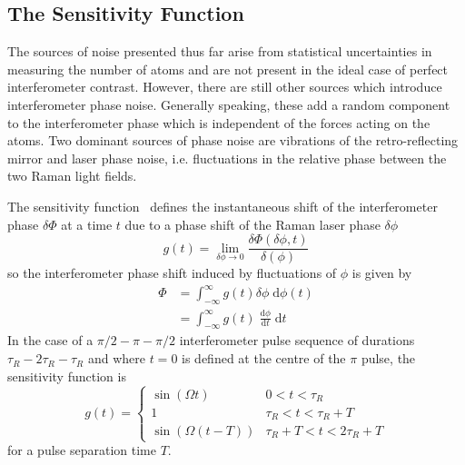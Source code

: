 \subsection{The Sensitivity Function}\label{subsec:sens_func}
The sources of noise presented thus far arise from statistical
uncertainties in measuring the number of atoms and are not present in
the ideal case of perfect interferometer contrast. However, there are
still other sources which introduce interferometer phase noise. Generally speaking, these add a random component to
the interferometer phase which is independent of the forces acting on
the atoms. Two dominant sources of phase noise are vibrations of the
retro-reflecting mirror and laser phase noise, i.e. fluctuations in
the relative phase between the two Raman light fields.
\par\noindent
The sensitivity function~\cite{Dick1987}
defines the instantaneous shift of the
interferometer phase \(\delta\Phi\) at a time \(t\) due to a phase
shift of the Raman laser phase \(\delta \phi\)
\begin{equation}
  g(t) = \lim_{\delta\phi \rightarrow 0} \frac{\delta\Phi(\delta \phi,
  t)}{\delta(\phi)}
  \label{eq:sensitivity_def}
\end{equation}
so the interferometer phase shift induced by fluctuations of
\(\phi\) is given by
\begin{align}
  \Phi &= \int_{-\infty}^\infty g(t)\delta \phi\;\mathrm{d}\phi(t)
  \nonumber\\
  &= \int_{-\infty}^\infty g(t)\;\frac{\mathrm{d}\phi}{\mathrm{d} t}\;
  \mathrm{d}t
  \label{eq:phase_contrib}
\end{align}
In the case of a \(\pi/2-\pi-\pi/2\) interferometer pulse sequence of
durations \(\tau_R-2 \tau_R - \tau_R\) and where \(t=0\) is defined at
the centre of the \(\pi\) pulse, the sensitivity function is 
\begin{equation}
    g(t) = 
    \begin{cases}
      \sin ( \Omega t) & 0<t<\tau_R  \\
      1 & \tau_R <t<\tau_R +T \\
      \sin (\Omega  (t-T)) & \tau_R +T<t<2 \tau_R +T
  \end{cases}
\label{eq:sensitivity_interferometer}
\end{equation}
for a pulse separation time \(T\). 
